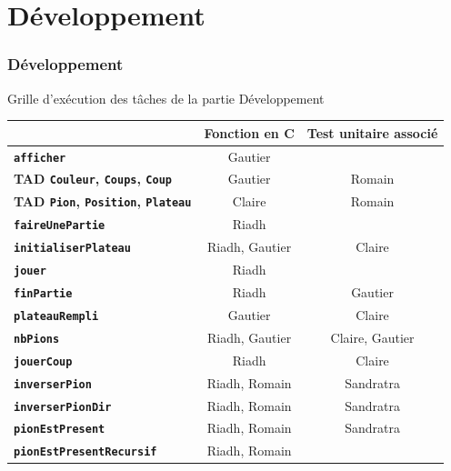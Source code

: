 \documentclass{beamer}
\begin{document}
		\section{Développement}
	\begin{frame}[label=dev] %
	\frametitle{Développement}
	\begin{alertblock}{Grille d’exécution des tâches de la partie \og Développement \fg }
   	\rightskip=0pt\leftskip=0pt
   	{\tiny
\begin{table}[h]
\begin{center}
\begin{tabular}{c|c|c|}
  \cline{2-3}
   & \textbf{Fonction en C} & \textbf{Test unitaire associé} \\ \hline
  \multicolumn{1}{|l|}{\textbf{\texttt{afficher}}} & Gautier & \cellcolor{lightgray} \\ \hline
  \multicolumn{1}{|l|}{\textbf{TAD \texttt{Couleur}, \texttt{Coups}, \texttt{Coup}}} & Gautier & Romain \\ \hline
  \multicolumn{1}{|l|}{\textbf{TAD \texttt{Pion}, \texttt{Position}, \texttt{Plateau}}} & Claire & Romain \\ \hline
  \multicolumn{1}{|l|}{\textbf{\texttt{faireUnePartie}}} & Riadh & \cellcolor{lightgray} \\ \hline
  \multicolumn{1}{|l|}{\textbf{\texttt{initialiserPlateau}}} & Riadh, Gautier & Claire \\ \hline
 \multicolumn{1}{|l|}{ \textbf{\texttt{jouer}}} & Riadh & \cellcolor{lightgray} \\ \hline
 \multicolumn{1}{|l|}{ \textbf{\texttt{finPartie}}} & Riadh & Gautier \\ \hline
  \multicolumn{1}{|l|}{\textbf{\texttt{plateauRempli}}} & Gautier & Claire \\ \hline
  \multicolumn{1}{|l|}{\textbf{\texttt{nbPions}}} & Riadh, Gautier & Claire, Gautier \\ \hline
  \multicolumn{1}{|l|}{\textbf{\texttt{jouerCoup}}} & Riadh & Claire \\ \hline
  \multicolumn{1}{|l|}{\textbf{\texttt{inverserPion}}} & Riadh, Romain & Sandratra \\ \hline
  \multicolumn{1}{|l|}{\textbf{\texttt{inverserPionDir}}} & Riadh, Romain & Sandratra\\ \hline
  \multicolumn{1}{|l|}{\textbf{\texttt{pionEstPresent}}} & Riadh, Romain & Sandratra \\ \hline
 \multicolumn{1}{|l|}{ \textbf{\texttt{pionEstPresentRecursif}}} & Riadh, Romain & \cellcolor{lightgray} \\ \hline

\end{tabular}
\end{center}
\end{table}}
\end{alertblock}
\end{frame}
\end{document}
